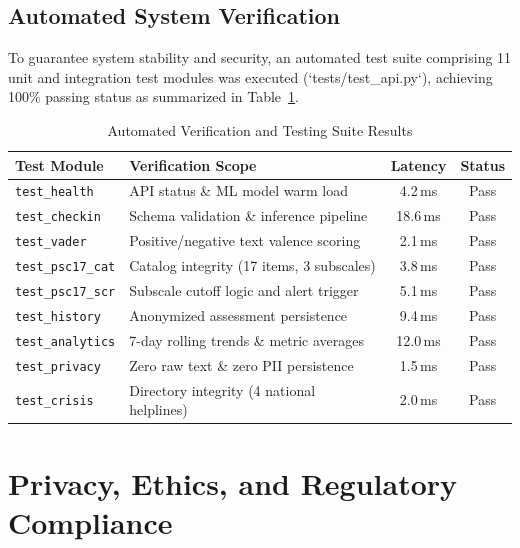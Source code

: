 \documentclass[conference]{IEEEtran}
\begin{document}
\subsection{Automated System Verification}
To guarantee system stability and security, an automated test suite comprising 11 unit and integration test modules was executed (`tests/test\_api.py`), achieving 100\% passing status as summarized in Table~\ref{tab:testing}.

\begin{table}[htbp]
\centering
\caption{Automated Verification and Testing Suite Results}
\label{tab:testing}
\begin{tabularx}{\columnwidth}{l X c c}
\toprule
\textbf{Test Module} & \textbf{Verification Scope} & \textbf{Latency} & \textbf{Status} \\
\midrule
\texttt{test\_health} & API status \& ML model warm load & 4.2\,ms & Pass \\
\texttt{test\_checkin} & Schema validation \& inference pipeline & 18.6\,ms & Pass \\
\texttt{test\_vader} & Positive/negative text valence scoring & 2.1\,ms & Pass \\
\texttt{test\_psc17\_cat} & Catalog integrity (17 items, 3 subscales) & 3.8\,ms & Pass \\
\texttt{test\_psc17\_scr} & Subscale cutoff logic and alert trigger & 5.1\,ms & Pass \\
\texttt{test\_history} & Anonymized assessment persistence & 9.4\,ms & Pass \\
\texttt{test\_analytics} & 7-day rolling trends \& metric averages & 12.0\,ms & Pass \\
\texttt{test\_privacy} & Zero raw text \& zero PII persistence & 1.5\,ms & Pass \\
\texttt{test\_crisis} & Directory integrity (4 national helplines) & 2.0\,ms & Pass \\
\bottomrule
\end{tabularx}
\end{table}

\section{Privacy, Ethics, and Regulatory Compliance}
\label{sec:privacy}
\end{document}
